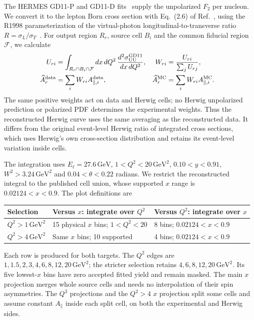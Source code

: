 \documentclass[10pt,a4paper]{article}
\newcommand{\apar}{A_{\parallel}}
\newcommand{\gev}{\mathrm{GeV}}
\begin{document}
The HERMES GD11-P and GD11-D fits~\cite{unpolarized} supply the unpolarized
$F_2$ per nucleon. We convert it to the lepton Born cross section with Eq.~(2.6)
of Ref.~\cite{unpolarized}, using the R1998 parameterization of the virtual-photon
longitudinal-to-transverse ratio $R=\sigma_L/\sigma_T$~\cite{r1998}.
For output region $R_r$, source cell $B_i$ and the common fiducial region $\mathcal F$,
we calculate
\begin{align}
 U_{ri}&=\int_{R_r\cap B_i\cap\mathcal F} dx\,dQ^2\,
       \frac{d^2\sigma_{\rm UU}^{\rm GD11}}{dx\,dQ^2},
 & W_{ri}&=\frac{U_{ri}}{\sum_j U_{rj}},\label{eq:weights}\\
 \widehat A_r^{\rm data}&=\sum_i W_{ri}A_{\parallel,i}^{\rm data},
 &\widehat A_r^{\rm MC}&=\sum_i W_{ri}A_{\parallel,i}^{\rm MC}.
\end{align}
The same positive weights act on data and Herwig cells; no Herwig unpolarized
prediction or polarized PDF determines the experimental weights.
Thus the reconstructed Herwig curve uses the same averaging as the reconstructed
data. It differs from the original event-level Herwig ratio of integrated
cross sections, which uses Herwig's own cross-section distribution and retains
its event-level variation inside cells.

The integration uses $E_\ell=27.6\,\gev$, $1<Q^2<20\,\gev^2$,
$0.10<y<0.91$, $W^2>3.24\,\gev^2$ and
$0.04<\theta<0.22$ radians. We restrict the reconstructed integral to the
published cell union, whose supported $x$ range is $0.02124<x<0.9$.
The plot definitions are
\begin{center}
\begin{tabular}{@{}lll@{}}
\toprule
Selection & Versus $x$: integrate over $Q^2$ & Versus $Q^2$: integrate over $x$\\
\midrule
$Q^2>1\,\gev^2$ & 15 physical $x$ bins; $1<Q^2<20$ & 8 bins; $0.02124<x<0.9$\\
$Q^2>4\,\gev^2$ & Same $x$ bins; 10 supported & 4 bins; $0.02124<x<0.9$\\
\bottomrule
\end{tabular}
\end{center}
Each row is produced for both targets. The $Q^2$ edges are
$1,1.5,2,3,4,6,8,12,20\,\gev^2$; the stricter selection retains
$4,6,8,12,20\,\gev^2$. Its five lowest-$x$ bins have zero accepted fitted yield
and remain masked. The main $x$ projection merges whole source cells and needs
no interpolation of their spin asymmetries. The $Q^2$ projections and the
$Q^2>4$ $x$ projection split some cells and assume constant $\apar$ inside each
split cell, on both the experimental and Herwig sides.
\end{document}
